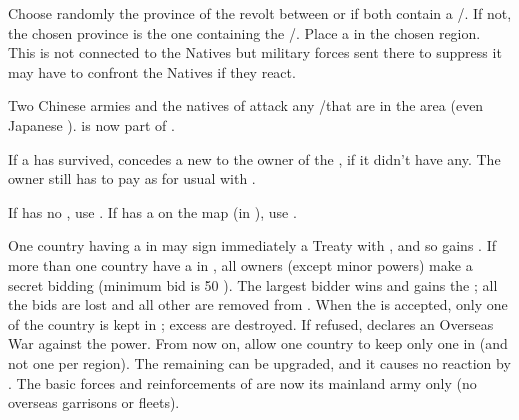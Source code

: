 


\phevnt
\aparag Choose randomly the province of the revolt between
\granderegionSingala or \granderegionFormose if both contain a \TP/\COL. If
not, the chosen province is the one containing the \TP/\COL.
\aparag Place a \REVOLT \facemoins in the chosen region. This \REVOLT is not
connected to the Natives but military forces sent there to suppress it may
have to confront the Natives if they react.








\phevnt
\aparag Two Chinese armies and the natives of \granderegionCorea attack any
\TP/\COL that are in the area (even Japanese \TP).
\aparag \granderegionCorea is now part of \paysChina.

\phpaix
\aparag If a \TP has survived,  concedes a new \dipAT to the owner
of the \TP, if it didn't have any. The owner still has to pay as for usual
\dipAT with \paysChine.





\condition{}
\aparag If \paysJapon has no \TP, use .
\aparag If \paysJapon has a \TP on the map (in \granderegionCorea), use
.



\phevnt
\aparag One country having a \TP in \paysJapon may sign immediately a Treaty
with \paysJapon, and so gains \dipAT. If more than one country have a \TP in
\paysJapon, all owners (except minor powers) make a secret bidding (minimum
bid is 50 \ducats).  The largest bidder wins and gains the \dipAT; all the
bids are lost and all other \TP are removed from \paysJapon.
\aparag When the \dipAT is accepted, only one \TP of the country is kept in
\paysJapon; excess \TP are destroyed. If refused, \paysJapon declares an
Overseas War against the power.
\aparag From now on, \dipAT allow one country to keep only one \TP in
\paysJapon (and not one per region). The remaining \TP can be upgraded, and it
causes no reaction by \paysJapon.
\aparag The basic forces and reinforcements of \paysJapon are now its mainland
army only (no overseas garrisons or fleets).

